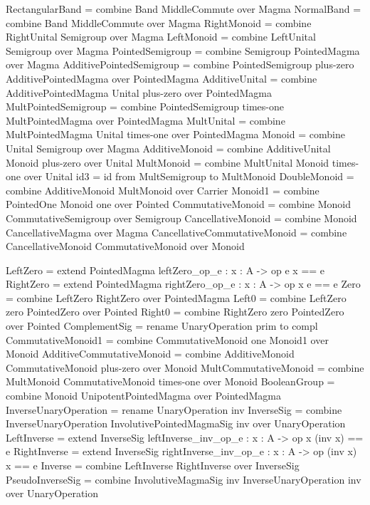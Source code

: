 \begin{togcode} 
RectangularBand = combine Band {} MiddleCommute {} over Magma
NormalBand = combine Band {} MiddleCommute {} over Magma
RightMonoid = combine RightUnital {} Semigroup {} over Magma
LeftMonoid  = combine LeftUnital {} Semigroup {} over Magma
PointedSemigroup = combine Semigroup {} PointedMagma {} over Magma 
AdditivePointedSemigroup = 
  combine PointedSemigroup plus-zero AdditivePointedMagma {} 
  over PointedMagma 
AdditiveUnital = 
  combine AdditivePointedMagma {} Unital plus-zero over PointedMagma 
MultPointedSemigroup = 
  combine PointedSemigroup times-one MultPointedMagma {} 
  over PointedMagma
MultUnital = 
  combine MultPointedMagma {} Unital times-one over PointedMagma    
Monoid = combine Unital {} Semigroup {} over Magma
AdditiveMonoid = combine AdditiveUnital {} Monoid plus-zero over Unital
MultMonoid = combine MultUnital {} Monoid times-one over Unital
id3 = id from MultSemigroup to MultMonoid
DoubleMonoid = combine AdditiveMonoid {} MultMonoid {} over Carrier 
Monoid1 = combine PointedOne {} Monoid one over Pointed
CommutativeMonoid = 
  combine Monoid {} CommutativeSemigroup {} over Semigroup
CancellativeMonoid = combine Monoid {} CancellativeMagma {} over Magma 
CancellativeCommutativeMonoid = 
  combine CancellativeMonoid {} CommutativeMonoid {} over Monoid
\end{togcode} 

\begin{togcode} 
LeftZero  = extend PointedMagma {leftZero_op_e  : {x : A} -> op e x == e}
RightZero = extend PointedMagma {rightZero_op_e : {x : A} -> op x e == e}
Zero = combine LeftZero {} RightZero {} over PointedMagma
Left0 = combine LeftZero zero PointedZero {} over Pointed
Right0 = combine RightZero zero PointedZero {} over Pointed
ComplementSig = rename UnaryOperation {prim to compl}
CommutativeMonoid1 = combine CommutativeMonoid one Monoid1 {} over Monoid
AdditiveCommutativeMonoid = 
  combine AdditiveMonoid {} CommutativeMonoid plus-zero over Monoid
MultCommutativeMonoid = 
  combine MultMonoid {} CommutativeMonoid times-one over Monoid
BooleanGroup = combine Monoid {} UnipotentPointedMagma {} over PointedMagma
InverseUnaryOperation = rename UnaryOperation inv  
InverseSig = 
  combine InverseUnaryOperation {} InvolutivePointedMagmaSig inv 
  over UnaryOperation
LeftInverse  = 
  extend InverseSig 
        {leftInverse_inv_op_e  : {x : A} -> op x (inv x) == e}
RightInverse = 
  extend InverseSig 
        {rightInverse_inv_op_e : {x : A} -> op (inv x) x == e}
Inverse = combine LeftInverse {} RightInverse {} over InverseSig
PseudoInverseSig = 
  combine InvolutiveMagmaSig inv InverseUnaryOperation inv 
  over UnaryOperation
\end{togcode} 

